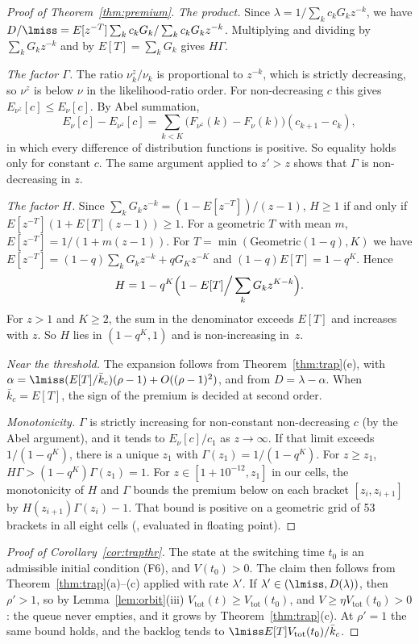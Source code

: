 \begin{proof}[Proof of Theorem~\ref{thm:premium}]
\emph{The product.} Since $\lambda=1/\sum_kc_kG_kz^{-k}$, we have
$D/\lmiss=E[z^{-T}]\sum_kc_kG_k/\sum_kc_kG_kz^{-k}$. Multiplying and dividing by $\sum_kG_kz^{-k}$ and by
$E[T]=\sum_kG_k$ gives $H\Gamma$.

\emph{The factor $\Gamma$.} The ratio $\nu^z_k/\nu_k$ is proportional to $z^{-k}$, which is strictly decreasing, so $\nu^z$ is
below $\nu$ in the likelihood-ratio order. For non-decreasing $c$ this gives $E_{\nu^z}[c]\le E_\nu[c]$. By Abel summation,
\[
E_\nu[c]-E_{\nu^z}[c]=\sum_{k<K}\bigl(F_{\nu^z}(k)-F_\nu(k)\bigr)(c_{k+1}-c_k),
\]
in which every difference of distribution functions is positive. So equality holds only for constant $c$. The same argument
applied to $z'>z$ shows that $\Gamma$ is non-decreasing in $z$.

\emph{The factor $H$.} Since $\sum_kG_kz^{-k}=(1-E[z^{-T}])/(z-1)$, $H\ge1$ if and only if $E[z^{-T}](1+E[T](z-1))\ge1$.
For a geometric $T$ with mean $m$, $E[z^{-T}]=1/(1+m(z-1))$. For $T=\min(\mathrm{Geometric}(1-q),K)$ we have
$E[z^{-T}]=(1-q)\sum_kG_kz^{-k}+qG_Kz^{-K}$ and $(1-q)E[T]=1-q^K$. Hence
\[
H=1-q^K\Bigl(1-E[T]\Big/\sum_kG_kz^{K-k}\Bigr).
\]
For $z>1$ and $K\ge2$, the sum in the denominator exceeds $E[T]$ and increases with $z$. So $H$ lies in $(1-q^K,1)$ and
is non-increasing in~$z$.

\emph{Near the threshold.} The expansion follows from Theorem~\ref{thm:trap}(e), with
$\alpha=\lmiss(E[T]/\bar k_c)(\rho-1)+O((\rho-1)^2)$, and from $D=\lambda-\alpha$. When $\bar k_c=E[T]$, the sign of the
premium is decided at second order.

\emph{Monotonicity.} $\Gamma$ is strictly increasing for non-constant non-decreasing $c$ (by the Abel argument), and it
tends to $E_\nu[c]/c_1$ as $z\to\infty$. If that limit exceeds $1/(1-q^K)$, there is a unique $z_1$ with
$\Gamma(z_1)=1/(1-q^K)$. For $z\ge z_1$, $H\Gamma>(1-q^K)\Gamma(z_1)=1$. For $z\in[1+10^{-12},z_1]$ in our cells, the
monotonicity of $H$ and $\Gamma$ bounds the premium below on each bracket $[z_i,z_{i+1}]$ by $H(z_{i+1})\Gamma(z_i)-1$. That
bound is positive on a geometric grid of 53 brackets in all eight cells (,
evaluated in floating point).
\end{proof}

\begin{proof}[Proof of Corollary~\ref{cor:trapthr}]
The state at the switching time $t_0$ is an admissible initial condition (F6), and $V(t_0)>0$. The claim then follows
from Theorem~\ref{thm:trap}(a)--(c) applied with rate $\lambda'$. If $\lambda'\in(\lmiss,D(\lambda))$, then $\rho'>1$, so
by Lemma~\ref{lem:orbit}(iii) $V_{\mathrm{tot}}(t)\ge V_{\mathrm{tot}}(t_0)$, and $V\ge\eta V_{\mathrm{tot}}(t_0)>0$:
the queue never empties, and it grows by Theorem~\ref{thm:trap}(c). At $\rho'=1$ the same bound holds, and the backlog tends
to $\lmiss E[T]V_{\mathrm{tot}}(t_0)/\bar k_c$.
\end{proof}

